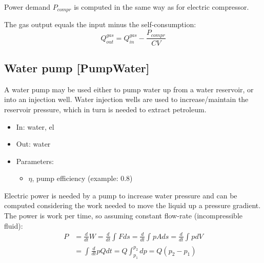 \documentclass[12pt]{article}
\begin{document}
\medskip\noindent
Power demand  \( P_{compr} \)  is computed in the same way as for electric compressor.

The gas output equals the input minus the self-consumption:
 \begin{equation}
 	Q_{out}^{gas}=Q_{in}^{gas}-\frac{P_{compr}}{CV} 
\end{equation}



\subsection{Water pump [PumpWater]}

A water pump may be used either to pump water up from a water reservoir, or into an injection well. Water injection wells are used to increase/maintain the reservoir pressure, which in turn is needed to extract petroleum.  


\begin{itemize}
\item In: water, el
\item Out: water
\item Parameters:
\begin{itemize}[noitemsep,topsep=0pt]
	\item $\eta$,  pump efficiency (example: 0.8)
\end{itemize}
\end{itemize}

\medskip\noindent
Electric power is needed by a pump to increase water pressure and can be computed considering the work needed to move the liquid up a pressure gradient. The power is work per time, so assuming constant flow-rate (incompressible fluid):
 \begin{equation}
 \begin{split}
 P &=\frac{d}{dt}W
	 =\frac{d}{dt} \int _{}^{}Fds
	 =\frac{d}{dt} \int _{}^{}pAds
	 =\frac{d}{dt} \int _{}^{}pdV
	 \\& 
	 = \int _{}^{}\frac{d}{dt}pQdt
	 =Q \int _{p_{1}}^{p_{2}}dp
	 =Q \left( p_{2}-p_{1} \right)  
 \end{split}
 \end{equation}
\end{document}
